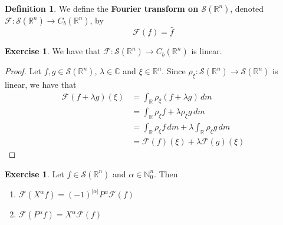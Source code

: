 \documentclass{book}
\theoremstyle{definition}
\newtheorem{defn}[definition]{Definition}
\newtheorem{ex}[definition]{Exercise}
\newcommand{\al}{\alpha}
\newcommand{\lam}{\lambda}
\newcommand{\C}{\mathbb{C}}
\newcommand{\N}{\mathbb{N}}
\newcommand{\R}{\mathbb{R}}
\newcommand{\MF}{\mathcal{F}}
\newcommand{\MS}{\mathcal{S}}
\DeclareMathOperator*{\0}{\mbf{0}}
\DeclareMathOperator*{\1}{\mbf{1}}
\newcommand{\dm}{\, d m}
\begin{document}
	\begin{defn}
		We define the \textbf{Fourier transform on $\MS(\R^n)$}, denoted $\MF: \MS(\R^n) \rightarrow C_b(\R^n)$, by 
		$$\MF(f) = \hat{f}$$
	\end{defn}
	
	\begin{ex}
		We have that $\MF: \MS(\R^n) \rightarrow C_b(\R^n)$ is linear. 
	\end{ex}
	
	\begin{proof}
		Let $f,g \in \MS(\R^n)$, $\lam \in \C$ and $\xi \in \R^n$. Since $\rho_{\xi}: \MS(\R^n) \rightarrow \MS(\R^n)$ is linear, we have that 
		\begin{align*}
			\MF(f + \lam g)(\xi) 
			& = \int_{\R} \rho_{\xi} (f + \lam g) \dm \\
			& = \int_{\R} \rho_{\xi}f + \lam \rho_{\xi} g \dm \\
			& = \int_{\R} \rho_{\xi} f \dm + \lam \int_{\R} \rho_{\xi} g \dm \\
			&= \MF(f)(\xi) + \lam \MF(g)(\xi)
		\end{align*}
	\end{proof}

	\begin{ex}
		Let $f \in \MS(\R^n)$ and $\al \in \N_0^n$. Then 
		\begin{enumerate}
			\item $\MF(X^{\al}f) = (-1)^{|\al|}P^{\al} \MF(f)$ 
			\item $\MF(P^{\al}f) = X^{\al} \MF(f)$
		\end{enumerate}
	\end{ex}
	
\end{document}

